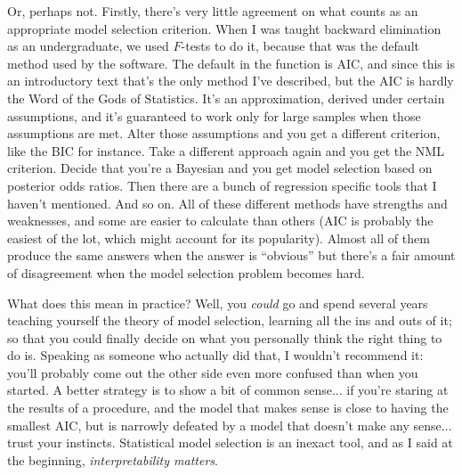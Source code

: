 Or, perhaps not. Firstly, there's very little agreement on what counts as an appropriate model selection criterion. When I was taught backward elimination as an undergraduate, we used $F$-tests to do it, because that was the default method used by the software. The default in the  function is AIC, and since this is an introductory text that's the only method I've described, but the AIC is hardly the Word of the Gods of Statistics. It's an approximation, derived under certain assumptions, and it's guaranteed to work only for large samples when those assumptions are met. Alter those assumptions and you get a different criterion, like the BIC for instance. Take a different approach again and you get the NML criterion. Decide that you're a Bayesian and you get model selection based on posterior odds ratios. Then there are a bunch of regression specific tools that I haven't mentioned. And so on. All of these different methods have strengths and weaknesses, and some are easier to calculate than others (AIC is probably the easiest of the lot, which might account for its popularity). Almost all of them produce the same answers when the answer is ``obvious'' but there's a fair amount of disagreement when the model selection problem becomes hard.

What does this mean in practice? Well, you {\it could} go and spend several years teaching yourself the theory of model selection, learning all the ins and outs of it; so that you could finally decide on what you personally think the right thing to do is. Speaking as someone who actually did that, I wouldn't recommend it: you'll probably come out the other side even more confused than when you started. A better strategy is to show a bit of common sense... if you're staring at the results of a  procedure, and the model that makes sense is close to having the smallest AIC, but is narrowly defeated by a model that doesn't make any sense... trust your instincts. Statistical model selection is an inexact tool, and as I said at the beginning, {\it interpretability matters}. 


